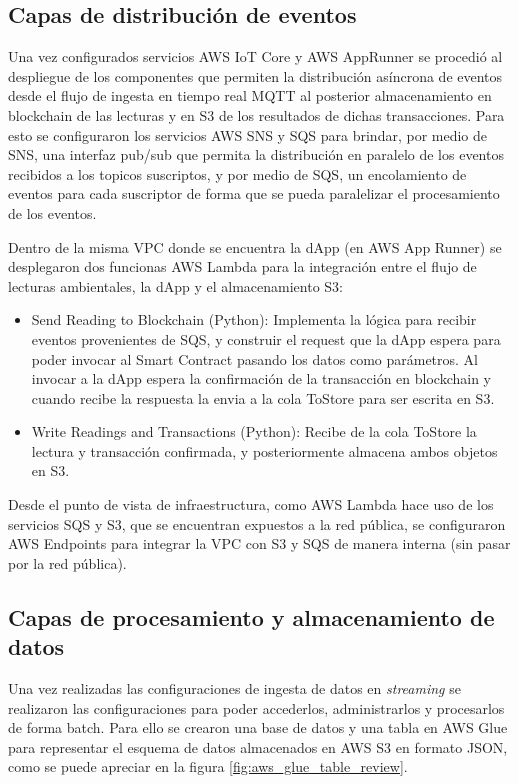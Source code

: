 \subsection{Capas de distribución de eventos}


Una vez configurados servicios AWS IoT Core y AWS AppRunner se procedió al despliegue de los componentes que permiten la distribución asíncrona de eventos desde el flujo de ingesta en tiempo real MQTT al posterior almacenamiento en blockchain de las lecturas y en S3 de los resultados de dichas transacciones. Para esto se configuraron los servicios AWS SNS y SQS para brindar, por medio de SNS, una interfaz pub/sub que permita la distribución en paralelo de los eventos recibidos a los topicos suscriptos, y por medio de SQS, un encolamiento de eventos para cada suscriptor de forma que se pueda paralelizar el procesamiento de los eventos.

Dentro de la misma VPC donde se encuentra la dApp (en AWS App Runner) se desplegaron dos funcionas AWS Lambda para la integración entre el flujo de lecturas ambientales, la dApp y el almacenamiento S3:

\begin{itemize}
	\item Send Reading to Blockchain (Python): Implementa la lógica para recibir eventos provenientes de SQS, y construir el request que la dApp espera para poder invocar al Smart Contract pasando los datos como parámetros. Al invocar a la dApp espera la confirmación de la transacción en blockchain y cuando recibe la respuesta la envia a la cola ToStore para ser escrita en S3.
	\item Write Readings and Transactions (Python): Recibe de la cola ToStore la lectura y transacción confirmada, y posteriormente almacena ambos objetos en S3.
\end{itemize}

Desde el punto de vista de infraestructura, como AWS Lambda hace uso de los servicios SQS y S3, que se encuentran expuestos a la red pública, se configuraron AWS Endpoints para integrar la VPC con S3 y SQS de manera interna (sin pasar por la red pública).


\subsection{Capas de procesamiento y almacenamiento de datos}

Una vez realizadas las configuraciones de ingesta de datos en \textit{streaming} se realizaron las configuraciones para poder accederlos, administrarlos y procesarlos de forma batch.
Para ello se crearon una base de datos y una tabla en AWS Glue para representar el esquema de datos almacenados en AWS S3 en formato JSON, como se puede apreciar en la figura \ref{fig:aws_glue_table_review}.

